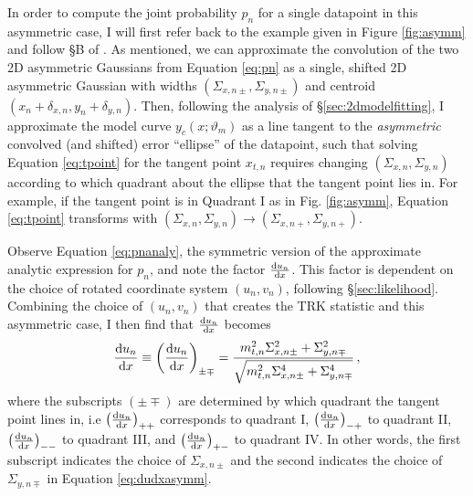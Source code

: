 In order to compute the joint probability $p_n$ for a single datapoint in this asymmetric case, I will first refer back to the example given in Figure \ref{fig:asymm} and follow \S B of \textcite{trotter}. As mentioned, we can approximate the convolution of the two 2D asymmetric Gaussians from Equation \eqref{eq:pn} as a single, shifted 2D asymmetric Gaussian with widths $(\Sigma_{x,n\pm}, \Sigma_{y,n\pm})$ and centroid $(x_n+\delta_{x,n}, y_n+\delta_{y,n})$. Then, following the analysis of \S\ref{sec:2dmodelfitting}, I approximate the model curve $y_c(x;\vartheta_m)$ as a line tangent to the \textit{asymmetric} convolved (and shifted) error ``ellipse'' of the datapoint, such that solving Equation \eqref{eq:tpoint} for the tangent point $x_{t,n}$ requires changing $(\Sigma_{x,n}, \Sigma_{y,n})$ according to which quadrant about the ellipse that the tangent point lies in. For example, if the tangent point is in Quadrant I as in Fig. \ref{fig:asymm}, Equation \eqref{eq:tpoint} transforms with $(\Sigma_{x,n}, \Sigma_{y,n})\rightarrow(\Sigma_{x,n+}, \Sigma_{y,n+})$.\label{pg:tpointasymm}

Observe Equation \eqref{eq:pnanaly}, the symmetric version of the approximate analytic expression for $p_n$, and note the factor $\dv{u_n}{x}$. This factor is dependent on the choice of rotated coordinate system $(u_n,v_n)$, following \S\ref{sec:likelihood}. Combining the choice of $(u_n,v_n)$ that creates the TRK statistic and this asymmetric case, I then find that $\dv{u_n}{x}$ becomes
\begin{equation}\label{eq:dudxasymm}
\dv{u_n}{x}\equiv\left(\dv{u_n}{x}\right)_{\pm\mp} = \frac{m_{t,n}^2\Sigma_{x,n\pm}^2+\Sigma_{y,n\mp}^2}{\sqrt{m_{t,n}^2\Sigma_{x,n\pm}^4+\Sigma_{y,n\mp}^4}} \, ,
\end{equation}
where the subscripts $(\pm\mp)$ are determined by which quadrant the tangent point lines in, i.e $\left(\dv{u_n}{x}\right)_{++}$ corresponds to quadrant I, $\left(\dv{u_n}{x}\right)_{-+}$ to quadrant II, $\left(\dv{u_n}{x}\right)_{--}$ to quadrant III, and $\left(\dv{u_n}{x}\right)_{+-}$ to quadrant IV. In other words, the first subscript indicates the choice of $\Sigma_{x,n\pm}$ and the second indicates the choice of $\Sigma_{y,n\mp}$ in Equation \eqref{eq:dudxasymm}.

